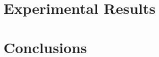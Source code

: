\documentclass{IEEEtran/IEEEtran}
\newcommand{\lee}[1]{ } %
\newcommand{\lee}[1]{ {\color{blue}$<$lee: #1$>$} } %
\begin{document}
\section{Experimental Results}\label{sec:experimental}

\lee{let's also check out scalability when we ``turn off'' faults. Also, how hard is it to turn them off or change the fault model? E.g., how many lines of spec need to be changed? Compare to rushby's?}

\section{Conclusions}\label{sec:conclusions}



\end{document}
